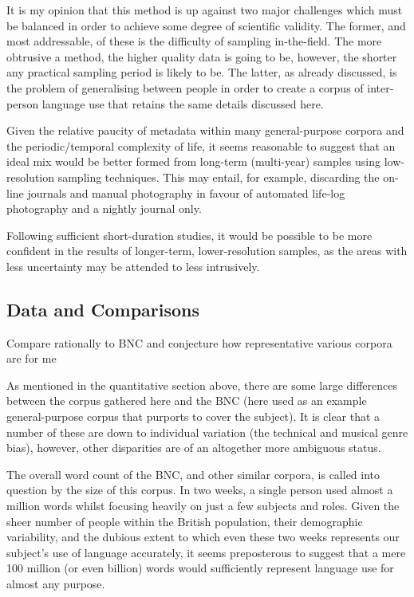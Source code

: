 It is my opinion that this method is up against two major challenges which must be balanced in order to achieve some degree of scientific validity.  The former, and most addressable, of these is the difficulty of sampling in-the-field.  The more obtrusive a method, the higher quality data is going to be, however, the shorter any practical sampling period is likely to be.  The latter, as already discussed, is the problem of generalising between people in order to create a corpus of inter-person language use that retains the same details discussed here.

Given the relative paucity of metadata within many general-purpose corpora and the periodic/temporal complexity of life, it seems reasonable to suggest that an ideal mix would be better formed from long-term (multi-year) samples using low-resolution sampling techniques.  This may entail, for example, discarding the on-line journals and manual photography in favour of automated life-log photography and a nightly journal only.

Following sufficient short-duration studies, it would be possible to be more confident in the results of longer-term, lower-resolution samples, as the areas with less uncertainty may be attended to less intrusively.







\subsection{Data and Comparisons}
Compare rationally to BNC and conjecture how representative various corpora are for me

As mentioned in the quantitative section above, there are some large differences between the corpus gathered here and the BNC (here used as an example general-purpose corpus that purports to cover the subject).  It is clear that a number of these are down to individual variation (the technical and musical genre bias), however, other disparities are of an altogether more ambiguous status.

The overall word count of the BNC, and other similar corpora, is called into question by the size of this corpus.  In two weeks, a single person used almost a million words whilst focusing heavily on just a few subjects and roles.  Given the sheer number of people within the British population, their demographic variability, and the dubious extent to which even these two weeks represents our subject's use of language accurately, it seems preposterous to suggest that a mere 100 million (or even billion) words would sufficiently represent language use for almost any purpose.


